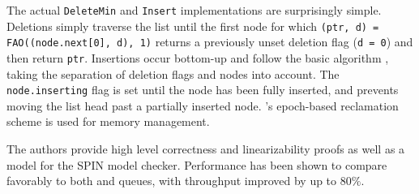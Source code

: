 The actual \lstinline|DeleteMin| and \lstinline|Insert| implementations are surprisingly simple.
Deletions simply traverse the list until the first node for which \lstinline|(ptr, d) = FAO((node.next[0], d), 1)|
returns a previously unset deletion flag (\lstinline|d = 0|) and then return \lstinline|ptr|.
Insertions occur bottom-up and follow the basic \citeauthor{fraser2004practical} algorithm \cite{fraser2004practical},
taking the separation of deletion flags and nodes into account. The \lstinline|node.inserting| flag
is set until the node has been fully inserted, and prevents moving the list head past a partially
inserted node. \citeauthor{fraser2004practical}'s epoch-based reclamation scheme \cite{fraser2004practical}
is used for memory management.

The authors provide high level correctness and linearizability proofs as well as a model for the
SPIN model checker. Performance has been shown to compare favorably to both
\citeauthor{sundell2003fast} and \citeauthor{shavit2000skiplist} queues, with throughput improved by
up to $80\%$.
